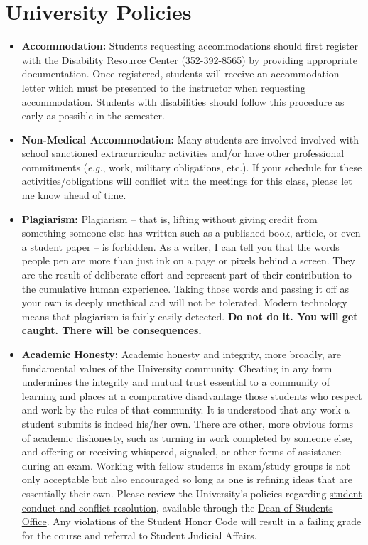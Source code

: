 \documentclass[11pt]{article}
\begin{document}
\section{University Policies}
\begin{itemize}
	\item \textbf{Accommodation:} Students requesting accommodations should first register with the {\href{https://disability.ufl.edu}{Disability Resource Center}} ({\href{tel:3523928565}{352-392-8565}}) by providing appropriate documentation. Once registered, students will receive an accommodation letter which must be presented to the instructor when requesting accommodation. Students with disabilities should follow this procedure as early as possible in the semester.
	\item \textbf{Non-Medical Accommodation:} Many students are involved involved with school sanctioned extracurricular activities and/or have other professional commitments (\textit{e.g.}, work, military obligations, etc.). If your schedule for these activities/obligations will conflict with the meetings for this class, please let me know ahead of time.
	\item \textbf{Plagiarism:} Plagiarism -- that is, lifting without giving credit from something someone else has written such as a published book, article, or even a student paper -- is forbidden. As a writer, I can tell you that the words people pen are more than just ink on a page or pixels behind a screen. They are the result of deliberate effort and represent part of their contribution to the cumulative human experience. Taking those words and passing it off as your own is deeply unethical and will not be tolerated. Modern technology means that plagiarism is fairly easily detected. \textbf{Do not do it. You will get caught. There will be consequences.}
\item \textbf{Academic Honesty:} Academic honesty and integrity, more broadly, are fundamental values of the University community. Cheating in any form undermines the integrity and mutual trust essential to a community of learning and places at a comparative disadvantage those students who respect and work by the rules of that community. It is understood that any work a student submits is indeed his/her own. There are other, more obvious forms of academic dishonesty, such as turning in work completed by someone else, and offering or receiving whispered, signaled, or other forms of assistance during an exam. Working with fellow students in exam/study groups is not only acceptable but also encouraged so long as one is refining ideas that are essentially their own. Please review the University's policies regarding {\href{https://sccr.dso.ufl.edu}{student conduct and conflict resolution}}, available through the {\href{https://dso.ufl.edu}{Dean of Students Office}}. Any violations of the Student Honor Code will result in a failing grade for the course and referral to Student Judicial Affairs.

\end{itemize}
\end{document}
